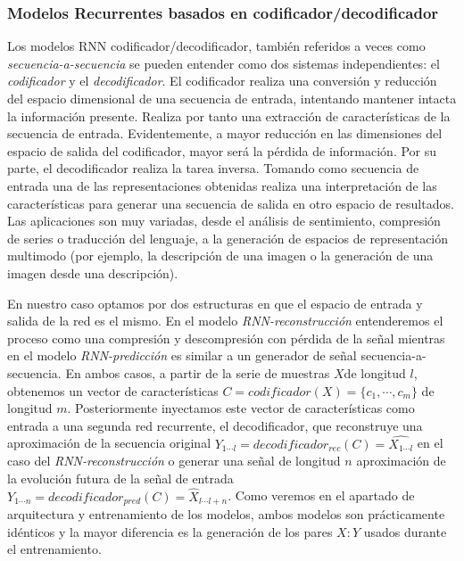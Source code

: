 \subsubsection{Modelos Recurrentes basados en codificador/decodificador}

Los modelos RNN codificador/decodificador, también referidos a veces como \textit{secuencia-a-secuencia} se pueden entender como dos sistemas independientes: el \textit{codificador} y el \textit{decodificador}. El codificador realiza una conversión y reducción del espacio dimensional de una secuencia de entrada, intentando mantener intacta la información presente. Realiza por tanto una extracción de características de la secuencia de entrada. Evidentemente, a mayor reducción en las dimensiones del espacio de salida del codificador, mayor será la pérdida de información. Por su parte, el decodificador realiza la tarea inversa. Tomando como secuencia de entrada una de las representaciones obtenidas realiza una interpretación de las características para generar una secuencia de salida en otro espacio de resultados. Las aplicaciones son muy variadas, desde el análisis de sentimiento, compresión de series o traducción del lenguaje, a la generación de espacios de representación multimodo (por ejemplo, la descripción de una imagen o la generación de una imagen desde una descripción). 

En nuestro caso optamos por dos estructuras en que el espacio de entrada y salida de la red es el mismo. En el modelo \textit{RNN-reconstrucción} entenderemos el proceso como una compresión y descompresión con pérdida de la señal mientras en el modelo \textit{RNN-predicción} es similar a un generador de señal secuencia-a-secuencia. En ambos casos, a partir de la serie de muestras $X$de longitud $l$, obtenemos un vector de características $C=codificador(X)=\{c_1,\cdots,c_m\}$ de longitud $m$. Posteriormente inyectamos este vector de características como entrada a una segunda red recurrente, el decodificador, que reconstruye una aproximación de la secuencia original $Y_{1\cdots l}=decodificador_{rec}(C)=\hat{X_{1\cdots l}}$ en el caso del \textit{RNN-reconstrucción} o generar una señal de longitud $n$ aproximación de la evolución futura de la señal de entrada $Y_{1\cdots n}=decodificador_{pred}(C)=\hat{X}_{l\cdots l+n}$. Como veremos en el apartado de arquitectura y entrenamiento de los modelos, ambos modelos son prácticamente idénticos y la mayor diferencia es la generación de los pares $X:Y$ usados durante el entrenamiento.

